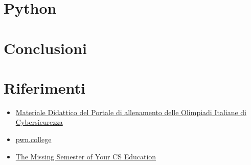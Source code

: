 \documentclass{beamer}
\begin{document}
\section{Python}
\begin{frame}{\insertsection}
\end{frame}

\section{Conclusioni}
\begin{frame}{\insertsection}
\end{frame}

\section{Riferimenti}
\begin{frame}{\insertsection}
\begin{itemize}
\item \href{https://training.olicyber.it/training}{Materiale Didattico del Portale di allenamento delle Olimpiadi Italiane di Cybersicurezza} 
\item \href{https://pwn.college/}{pwn.college}
\item \href{https://missing.csail.mit.edu/}{The Missing Semester of Your CS Education}
\end{itemize}
\end{frame}
\end{document}
